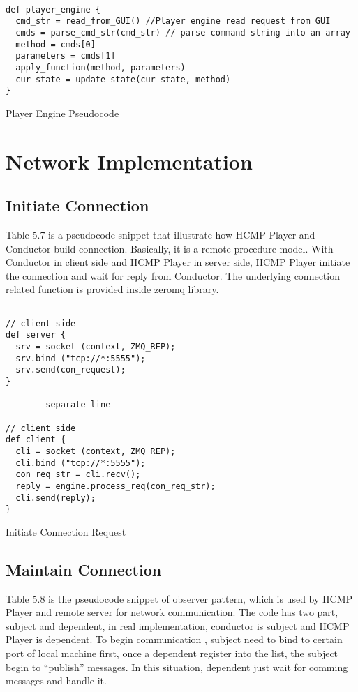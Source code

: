 \begin{table}[htdp]
\centering
\begin{lstlisting}

def player_engine {
  cmd_str = read_from_GUI() //Player engine read request from GUI 
  cmds = parse_cmd_str(cmd_str) // parse command string into an array
  method = cmds[0]
  parameters = cmds[1]
  apply_function(method, parameters)
  cur_state = update_state(cur_state, method)
}

\end{lstlisting}
\caption[Player Engine Pseudocode]{Player Engine Pseudocode}
\end{table}

\section{Network Implementation}

\subsection{Initiate Connection}
Table 5.7 is a pseudocode snippet that illustrate how HCMP Player and   
Conductor build connection. Basically, it is a remote procedure model.
With Conductor in client side and HCMP Player in server side, HCMP Player  
initiate the connection and wait for reply from Conductor. The underlying
connection related function is provided inside zeromq library.

\begin{table}[htdp]
\centering
\begin{lstlisting}

// client side
def server {
  srv = socket (context, ZMQ_REP);
  srv.bind ("tcp://*:5555");
  srv.send(con_request);
}

------- separate line -------

// client side
def client {
  cli = socket (context, ZMQ_REP);
  cli.bind ("tcp://*:5555");
  con_req_str = cli.recv();
  reply = engine.process_req(con_req_str);
  cli.send(reply);
}

\end{lstlisting}
\caption[Initiate Connection Request]{Initiate Connection Request}
\end{table}

\subsection{Maintain Connection}  
Table 5.8 is the pseudocode snippet of observer pattern, 
which is used by HCMP Player and remote server for network
communication. 
The code has two part, subject and dependent, in real 
implementation, conductor is subject and HCMP Player 
is dependent. To begin communication 
, subject need to bind to certain port of local machine first, once 
a dependent register into the list, the subject begin to ``publish'' 
messages. In this situation, dependent just wait for comming 
messages and handle it.

